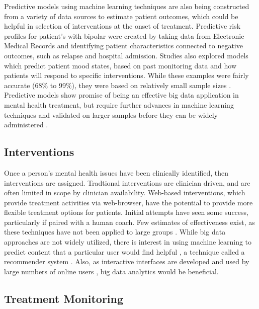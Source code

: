 \documentclass[sigconf]{acmart}
\begin{document}
Predictive models using machine learning techniques are also being constructed from a variety of data sources to estimate patient outcomes, which could be helpful in selection of interventions at the onset of treatment. \cite{bigdatabipolar} Predictive risk profiles for patient's with bipolar were created by taking data from Electronic Medical Records and identifying patient characteristics connected to negative outcomes, such as relapse and hospital admission. Studies also explored models which predict patient mood states, based on past monitoring data and how patients will respond to specific interventions. While these examples were fairly accurate (68\% to 99\%), they were based on relatively small sample sizes \cite{machinelearnbipolar}.  Predictive models show promise of being an effective big data application in mental health treatment, but require further advances in machine learning techniques and validated on larger samples before they can be widely administered \cite{bigdatabipolar}.

\subsection{Interventions}

Once a person's mental health issues have been clinically identified, then interventions are assigned. Tradtional interventions are clinician driven, and are often limited in scope by clinician availability. Web-based interventions, which provide treatment activities via web-browser, have the potential to provide more flexible treatment options for patients. Initial attempts have seen some success, particularly if paired with a human coach. Few estimates of effectiveness exist, as these techniques have not been applied to large groups \cite{webtx}. While big data approaches are not widely utilized, there is interest in using machine learning to predict content that a particular user would find helpful \cite{bitreview}, a technique called a recommender system \cite{recomdef}. Also, as interactive interfaces are developed and used by large numbers of online users \cite{webtx}, big data analytics would be beneficial. 

\subsection{Treatment Monitoring}
\end{document}
